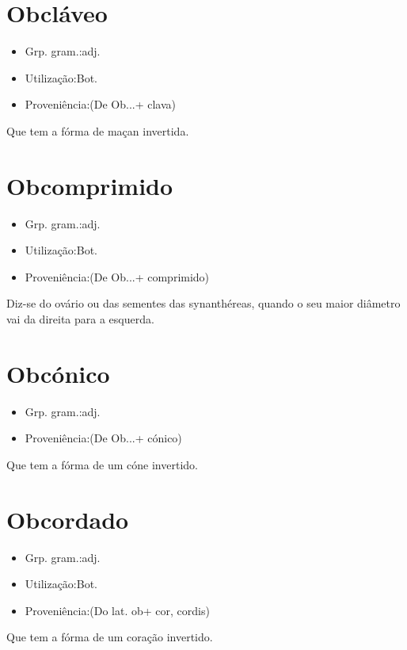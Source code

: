 \section{Obcláveo}
\begin{itemize}
\item {Grp. gram.:adj.}
\end{itemize}
\begin{itemize}
\item {Utilização:Bot.}
\end{itemize}
\begin{itemize}
\item {Proveniência:(De \textunderscore Ob...\textunderscore  + \textunderscore clava\textunderscore )}
\end{itemize}
Que tem a fórma de maçan invertida.
\section{Obcomprimido}
\begin{itemize}
\item {Grp. gram.:adj.}
\end{itemize}
\begin{itemize}
\item {Utilização:Bot.}
\end{itemize}
\begin{itemize}
\item {Proveniência:(De \textunderscore Ob...\textunderscore  + \textunderscore comprimido\textunderscore )}
\end{itemize}
Diz-se do ovário ou das sementes das synanthéreas, quando o seu maior diâmetro vai da direita para a esquerda.
\section{Obcónico}
\begin{itemize}
\item {Grp. gram.:adj.}
\end{itemize}
\begin{itemize}
\item {Proveniência:(De \textunderscore Ob...\textunderscore  + \textunderscore cónico\textunderscore )}
\end{itemize}
Que tem a fórma de um cóne invertido.
\section{Obcordado}
\begin{itemize}
\item {Grp. gram.:adj.}
\end{itemize}
\begin{itemize}
\item {Utilização:Bot.}
\end{itemize}
\begin{itemize}
\item {Proveniência:(Do lat. \textunderscore ob\textunderscore  + \textunderscore cor\textunderscore , \textunderscore cordis\textunderscore )}
\end{itemize}
Que tem a fórma de um coração invertido.
